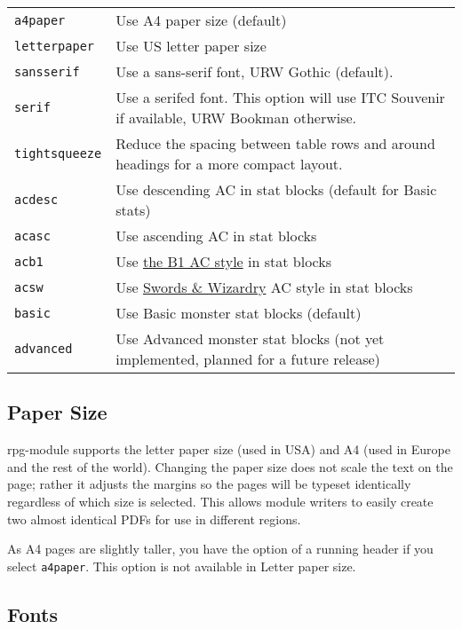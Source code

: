 \documentclass[a4paper,serif]{rpg-module}
\begin{document}
\begin{tabularx}{\linewidth}{lX}
\verb|a4paper|      & Use A4 paper size (default)\\
\verb|letterpaper|  & Use US letter paper size\\
\verb|sansserif|    & Use a sans-serif font, URW Gothic (default).\\
\verb|serif|        & Use a serifed font. This option will use ITC Souvenir if available, URW Bookman otherwise.\\
\verb|tightsqueeze| & Reduce the spacing between table rows and around headings for a more compact layout.\\
\verb|acdesc|       & Use descending AC in stat blocks (default for Basic stats)\\
\verb|acasc|        & Use ascending AC in stat blocks\\
\verb|acb1|         & Use \href{http://zenopusarchives.blogspot.com/2014/02/ascending-ac-in-holmes-basic.html}{the B1 AC style} in stat blocks\\
\verb|acsw|         & Use \href{http://www.swordsandwizardry.com/}{Swords \& Wizardry} AC style in stat blocks\\
\verb|basic|        & Use Basic monster stat blocks (default)\\
\verb|advanced|     & Use Advanced monster stat blocks (not yet implemented, planned for a future release)\\
\end{tabularx}

\subsection*{Paper Size}

rpg-module supports the letter paper size (used in USA) and A4 (used in Europe and the rest of the world). Changing the paper size
does not scale the text on the page; rather it adjusts the margins so the pages will be typeset identically regardless
of which size is selected. This allows module writers to easily create two almost identical PDFs for use in different regions.

As A4 pages are slightly taller, you have the option of a running header if you select \verb|a4paper|. This option is not available
in Letter paper size.

\subsection*{Fonts}
\end{document}
